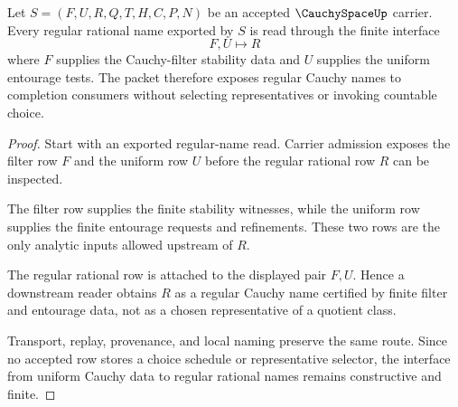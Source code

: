 \begin{theorem}
\label{thm:cauchyspace-uniform-regseq-interface}
Let $S=(F,U,R,Q,T,H,C,P,N)$ be an accepted $\CauchySpaceUp$ carrier. Every regular rational name exported by $S$ is read through the finite interface
$$
F,U \longmapsto R
$$
where $F$ supplies the Cauchy-filter stability data and $U$ supplies the uniform entourage tests. The packet therefore exposes regular Cauchy names to completion consumers without selecting representatives or invoking countable choice.
\end{theorem}
\begin{proof}
Start with an exported regular-name read. Carrier admission exposes the filter row $F$ and the uniform row $U$ before the regular rational row $R$ can be inspected.

The filter row supplies the finite stability witnesses, while the uniform row supplies the finite entourage requests and refinements. These two rows are the only analytic inputs allowed upstream of $R$.

The regular rational row is attached to the displayed pair $F,U$. Hence a downstream reader obtains $R$ as a regular Cauchy name certified by finite filter and entourage data, not as a chosen representative of a quotient class.

Transport, replay, provenance, and local naming preserve the same route. Since no accepted row stores a choice schedule or representative selector, the interface from uniform Cauchy data to regular rational names remains constructive and finite.
\end{proof}


